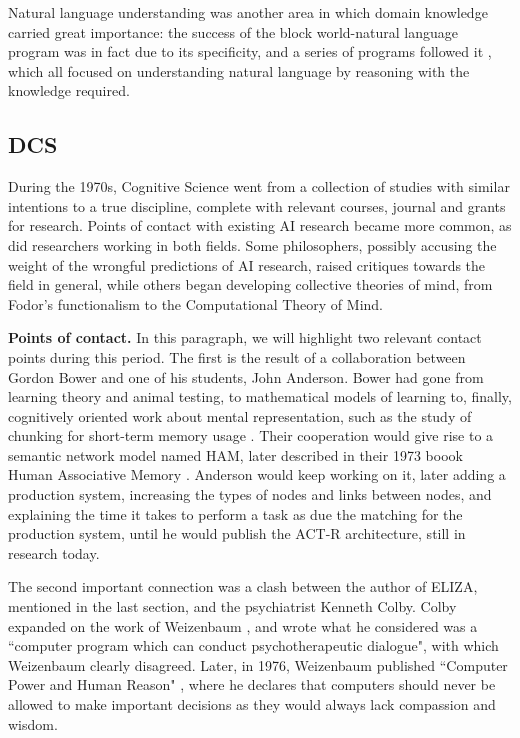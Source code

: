 \documentclass[../main.tex]{subfiles}
\begin{document}
Natural language understanding was another area in which domain knowledge carried great importance: the success of the block world-natural language program was in fact due to its specificity, and a series of programs followed it \parencite{schankScriptsPlansGoals1977} \parencite{wilenskyUnderstandingGoalbasedStories1978} \parencite{schankComputerUnderstanding1981}, which all focused on understanding natural language by reasoning with the knowledge required.

\subsection{DCS}
During the 1970s, Cognitive Science went from a collection of studies with similar intentions to a true discipline, complete with relevant courses, journal and grants for research. Points of contact with existing AI research became more common, as did researchers working in both fields. Some philosophers, possibly accusing the weight of the wrongful predictions of AI research, raised critiques towards the field in general, while others began developing collective theories of mind, from Fodor's functionalism to the Computational Theory of Mind.

\vspace{4pt}
\textbf{Points of contact.}
In this paragraph, we will highlight two relevant contact points during this period. The first is the result of a collaboration between Gordon Bower and one of his students, John Anderson. Bower had gone from learning theory and animal testing, to mathematical models of learning to, finally, cognitively oriented work about mental representation, such as the study of chunking for short-term memory usage \parencite{GordonBowerPsycNET}. Their cooperation would give rise to a semantic network model named HAM, later described in their 1973 boook Human Associative Memory \parencite{andersonHumanAssociativeMemory1973}. Anderson would keep working on it, later adding a production system, increasing the types of nodes and links between nodes, and explaining the time it takes to perform a task as due the matching for the production system, until he would publish the ACT-R architecture, still in research today.

The second important connection was a clash between the author of ELIZA, mentioned in the last section, and the psychiatrist Kenneth Colby. Colby expanded on the work of Weizenbaum \parencite{colbyComputerMethodPsychotherapy1966}, and wrote what he considered was a ``computer program which can conduct psychotherapeutic dialogue", with which Weizenbaum clearly disagreed. Later, in 1976, Weizenbaum published ``Computer Power and Human Reason" \parencite{weizenbaumComputerPowerHuman1976}, where he declares that computers should never be allowed to make important decisions as they would always lack compassion and wisdom.
\end{document}
